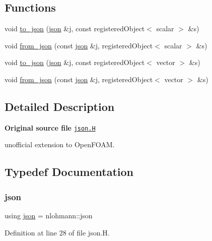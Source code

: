 \subsection*{Functions}
\begin{DoxyCompactItemize}
\item 
void \hyperlink{namespaceFoam_a8f902008c5eedaec2a88f46546efb8d3}{to\+\_\+json} (\hyperlink{dictModifier_8C_ab701e3ac61a85b337ec5c1abaad6742d}{json} \&j, const registered\+Object$<$ scalar $>$ \&s)
\item 
void \hyperlink{namespaceFoam_a13d3dea89b2df135b0f566e278cd4287}{from\+\_\+json} (const \hyperlink{dictModifier_8C_ab701e3ac61a85b337ec5c1abaad6742d}{json} \&j, registered\+Object$<$ scalar $>$ \&s)
\item 
void \hyperlink{namespaceFoam_aaa31b2da863e0a9f79a75f01797f5107}{to\+\_\+json} (\hyperlink{dictModifier_8C_ab701e3ac61a85b337ec5c1abaad6742d}{json} \&j, const registered\+Object$<$ vector $>$ \&s)
\item 
void \hyperlink{namespaceFoam_a520a95b521a147b32c5bbebd6d1c41cf}{from\+\_\+json} (const \hyperlink{dictModifier_8C_ab701e3ac61a85b337ec5c1abaad6742d}{json} \&j, registered\+Object$<$ vector $>$ \&s)
\end{DoxyCompactItemize}


\subsection{Detailed Description}
{\bfseries Original source file} \href{../../../home/carlo/data/GeN-Foam/GeN-Foam_ffn/GeN-Foam/GeN-Foam/FMU4FOAM/ECI4FOAM/src/externalComm/networkInterface/json.H}{\tt json.\+H}

\begin{DoxyVerb}unofficial extension to OpenFOAM.\end{DoxyVerb}


\subsection{Typedef Documentation}
\mbox{\label{json_8H_ab701e3ac61a85b337ec5c1abaad6742d}} 
\subsubsection{\texorpdfstring{json}{json}}
{\footnotesize\ttfamily using \hyperlink{dictModifier_8C_ab701e3ac61a85b337ec5c1abaad6742d}{json} =  nlohmann\+::json}



Definition at line 28 of file json.\+H.


